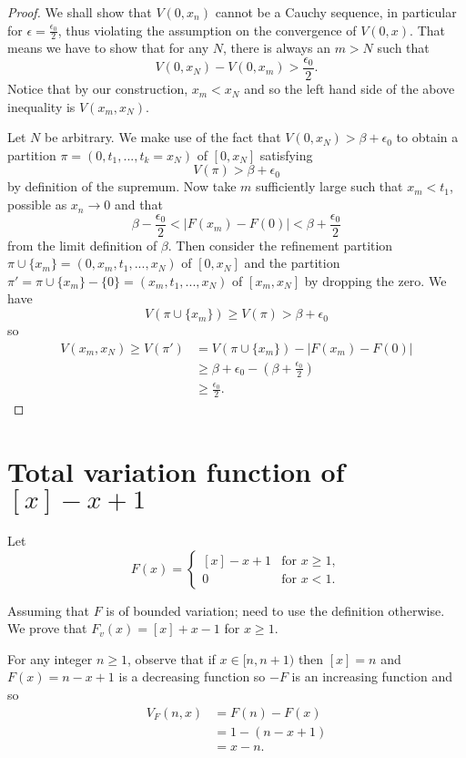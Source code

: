 \documentclass{article}
\newcommand{\Abs}[1]{\left| #1 \right|}
\begin{document}
\begin{enumerate}
\begin{proof}
We shall show that $V(0, x_n)$ cannot be a Cauchy sequence, in particular for $\epsilon = \frac{\epsilon_0}{2}$, thus violating the assumption on the convergence of $V(0, x)$. That means we have to show that for any $N$, there is always an $m > N$ such that
$$V(0, x_N) - V(0, x_m) > \frac{\epsilon_0}{2}.$$
Notice that by our construction, $x_m < x_N$ and so the left hand side of the above inequality is $V(x_m, x_N)$.

Let $N$ be arbitrary. We make use of the fact that $V(0, x_N) > \beta + \epsilon_0$ to obtain a partition $\pi = (0, t_1, ..., t_k = x_N)$ of $[0, x_N]$ satisfying
$$V(\pi) > \beta + \epsilon_0$$
by definition of the supremum. Now take $m$ sufficiently large such that $x_m < t_1$, possible as $x_n \rightarrow 0$ and that
$$\beta - \frac{\epsilon_0}{2} < \Abs{ F(x_m) - F(0) } < \beta + \frac{\epsilon_0}{2}$$
from the limit definition of $\beta$. Then consider the refinement partition $\pi \cup \{x_m\} = (0, x_m, t_1, ..., x_N)$ of $[0, x_N]$ and the partition $\pi' = \pi \cup \{x_m\} - \{0\} = (x_m, t_1, ..., x_N)$ of $[x_m, x_N]$ by dropping the zero. We have
$$V(\pi \cup \{x_m\}) \geq V(\pi) > \beta + \epsilon_0$$
so
\begin{align*}
V(x_m, x_N) \geq V(\pi') &= V(\pi \cup \{x_m\}) - \Abs{ F(x_m) - F(0) }\\
&\geq \beta + \epsilon_0 - \left( \beta + \frac{\epsilon_0}{2} \right)\\
&\geq \frac{\epsilon_0}{2}.
\end{align*}
\end{proof}

\end{enumerate}

\section{Total variation function of $[x] - x + 1$}

Let
$$F(x) = \begin{cases}
[x] - x + 1 &\text{for } x \geq 1,\\
0 &\text{for }x < 1.
\end{cases}$$

Assuming that $F$ is of bounded variation; need to use the definition otherwise. We prove that $F_v(x) = [x] + x - 1$ for $x \geq 1$.

For any integer $n \geq 1$, observe that if $x \in [n, n+1)$ then $[x] = n$ and $F(x) = n - x + 1$ is a decreasing function so $-F$ is an increasing function and so
\begin{align*}
V_F(n, x) &= F(n) - F(x)\\
&= 1 - (n - x + 1)\\
&= x - n.
\end{align*}
\end{document}
